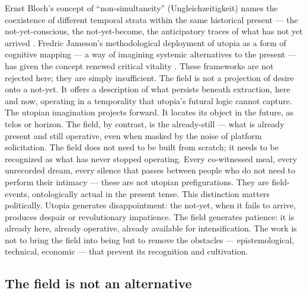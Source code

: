 Ernst Bloch's concept of ``non-simultaneity'' (Ungleichzeitigkeit) names the coexistence of different temporal strata within the same historical present --- the not-yet-conscious, the not-yet-become, the anticipatory traces of what has not yet arrived \cite{bloch_1932}. Fredric Jameson’s methodological deployment of utopia as a form of cognitive mapping — a way of imagining systemic alternatives to the present — has given the concept renewed critical vitality \cite{jameson_2005}. These frameworks are not rejected here; they are simply insufficient. The field is not a projection of desire onto a not-yet. It offers a description of what persists beneath extraction, here and now, operating in a temporality that utopia’s futural logic cannot capture. The utopian imagination projects forward. It locates its object in the future, as telos or horizon. The field, by contrast, is the already-still — what is already present and still operative, even when masked by the noise of platform solicitation. The field does not need to be built from scratch; it needs to be recognized as what has never stopped operating. Every co-witnessed meal, every unrecorded dream, every silence that passes between people who do not need to perform their intimacy — these are not utopian prefigurations. They are field-events, ontologically actual in the present tense. This distinction matters politically. Utopia generates disappointment: the not-yet, when it fails to arrive, produces despair or revolutionary impatience. The field generates patience: it is already here, already operative, already available for intensification. The work is not to bring the field into being but to remove the obstacles — epistemological, technical, economic — that prevent its recognition and cultivation.

\subsection{The field is not an alternative}

